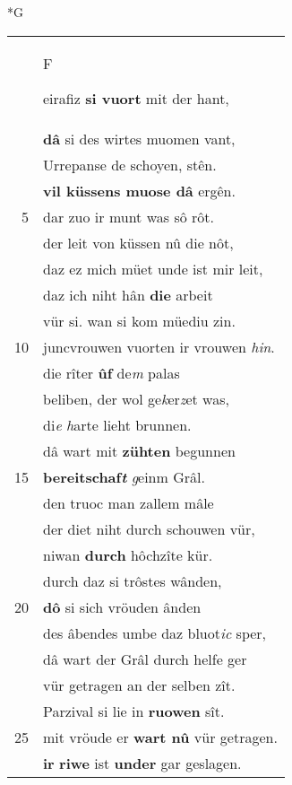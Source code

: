 \documentclass[8pt,a4paper,notitlepage]{article}
\begin{document}
\begin{table}[ht]
\begin{minipage}[t]{0.5\linewidth}
\small
\begin{center}*G
\end{center}
\begin{tabular}{rl}
 & \begin{large}F\end{large}eirafiz \textbf{si vuort} mit der hant,\\ 
 & \textbf{dâ} si des wirtes muomen vant,\\ 
 & Urrepanse de schoyen, stên.\\ 
 & \textbf{vil küssens muose dâ} ergên.\\ 
5 & dar zuo ir munt was sô rôt.\\ 
 & der leit von küssen nû die nôt,\\ 
 & daz ez mich müet unde ist mir leit,\\ 
 & daz ich niht hân \textbf{die} arbeit\\ 
 & vür si. wan si kom müediu zin.\\ 
10 & juncvrouwen vuorten ir vrouwen \textit{hin}.\\ 
 & die rîter \textbf{ûf} de\textit{m} palas\\ 
 & beliben, der wol ge\textit{k}er\textit{z}et was,\\ 
 & di\textit{e} \textit{h}arte lieht brunnen.\\ 
 & dâ wart mit \textbf{zühten} begunnen\\ 
15 & \textbf{bereitschaf\textit{t}} \textit{g}einm Grâl.\\ 
 & den truoc man zallem mâle\\ 
 & der diet niht durch schouwen vür,\\ 
 & niwan \textbf{durch} hôchzîte kür.\\ 
 & durch daz si trôstes wânden,\\ 
20 & \textbf{dô} si sich vröuden ânden\\ 
 & des âbendes umbe daz bluot\textit{ic} sper,\\ 
 & dâ wart der Grâl durch helfe ger\\ 
 & vür getragen an der selben zît.\\ 
 & Parzival si lie in \textbf{ruowen} sît.\\ 
25 & mit vröude er \textbf{wart nû} vür getragen.\\ 
 & \textbf{ir} \textbf{riwe} ist \textbf{under} gar geslagen.\\ 

\end{tabular}
\end{minipage}
\end{table}
\end{document}
